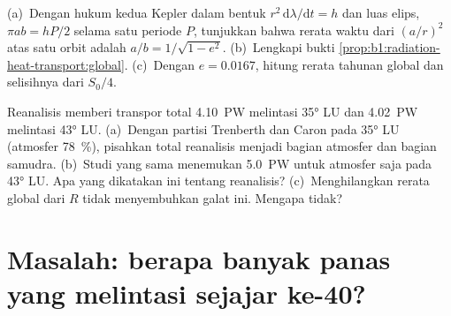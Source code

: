 \begin{exercise}[$\star\star\star$]\label{exo:b1:radiation-heat-transport:11}
(a)~Dengan hukum kedua Kepler dalam bentuk $r^2\,\mathrm d\lambda/\mathrm dt = h$
dan luas elips, $\pi a b = hP/2$ selama satu periode $P$, tunjukkan bahwa rerata waktu
dari $(a/r)^2$ atas satu orbit adalah $a/b = 1/\sqrt{1 - e^2}$. (b)~Lengkapi
bukti \cref{prop:b1:radiation-heat-transport:global}. (c)~Dengan $e = 0.0167$,
hitung rerata tahunan global dan selisihnya dari $S_0/4$.
\end{exercise}

\begin{exercise}[$\star\star\star$]\label{exo:b1:radiation-heat-transport:12}
Reanalisis memberi transpor total \qty{4.10}{PW} melintasi \ang{35} LU dan \qty{4.02}{PW} melintasi \ang{43} LU. (a)~Dengan partisi Trenberth dan Caron pada \ang{35} LU (atmosfer \qty{78}{\percent}), pisahkan total reanalisis menjadi bagian atmosfer dan bagian samudra. (b)~Studi yang sama menemukan \qty{5.0}{PW} untuk atmosfer saja pada \ang{43} LU. Apa yang dikatakan ini tentang reanalisis? (c)~Menghilangkan rerata global dari $R$ tidak menyembuhkan galat ini. Mengapa tidak?
\end{exercise}

\section{Masalah: berapa banyak panas yang melintasi sejajar ke-40?}

